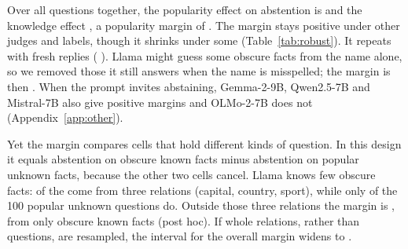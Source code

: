 \documentclass[11pt]{article}
\begin{document}
Over all questions together, the popularity effect on abstention is \hmLlamaPopEff{} \hmLlamaPopEffCI{} and the knowledge effect \hmLlamaKnowEff{} \hmLlamaKnowEffCI, a popularity margin of \hmLlamaDiff{} \hmLlamaDiffCI. The margin stays positive under other judges and labels, though it shrinks under some (Table~\ref{tab:robust}). It repeats with fresh replies (\frDiff{} \frDiffCI). Llama might guess some obscure facts from the name alone, so we removed those it still answers when the name is misspelled; the margin is then \ncDiff{} \ncDiffCI. When the prompt invites abstaining, Gemma-2-9B, Qwen2.5-7B and Mistral-7B also give positive margins and OLMo-2-7B does not (Appendix~\ref{app:other}).

Yet the margin compares cells that hold different kinds of question. In this design it equals abstention on obscure known facts minus abstention on popular unknown facts, because the other two cells cancel. Llama knows few obscure facts: \rcTopThree{} of the \gsObsKnownTotal{} come from three relations (capital, country, sport), while only \msInUnkN{} of the 100 popular unknown questions do. Outside those three relations the margin is \msOutDiff{} \msOutDiffCI, from only \msOutKnownN{} obscure known facts (post hoc). If whole relations, rather than questions, are resampled, the interval for the overall margin widens to \rcClusCI.

\begin{table}[t]
\centering
\footnotesize\setlength{\tabcolsep}{3pt}
\caption{Holding the relation fixed, regex measure on all \faLlamaN{} labeled questions. All: every relation together. Within: mean over the three relations with at least 3 questions in every cell (country, composer, sport), resampling questions within relation and cell. Post hoc.}
\label{tab:within}
\end{table}
\end{document}
